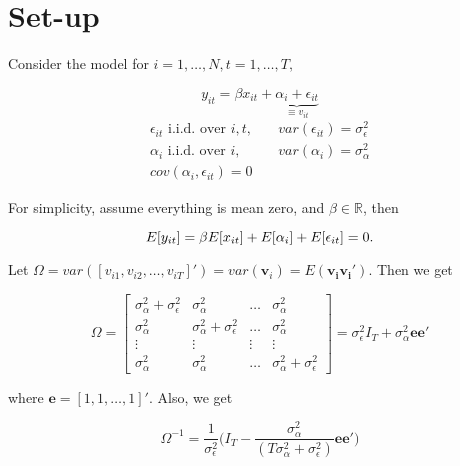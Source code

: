 \documentclass[11pt]{article}
\begin{document}



\doublespacing


\section*{Set-up}

Consider the model for $i=1, \ldots, N, t=1, \ldots, T,$

\[
y_{it} = \beta x_{it} + \underbrace{\alpha_i + \epsilon_{it}}_{\equiv v_{it}}
\]
\begin{align*}
\epsilon_{it}\,\, \text{i.i.d. over $i, t$}, \quad & var(\epsilon_{it})=\sigma_\epsilon^2\\
\alpha_i \,\, \text{i.i.d. over $i$},\quad & var(\alpha_i) = \sigma_\alpha^2 \\
cov(\alpha_i, \epsilon_{it}) = 0 
\end{align*}

For simplicity, assume everything is mean zero, and $\beta \in \mathbb{R}$, then

\[
E[y_{it}]=\beta E[x_{it}] + E[\alpha_i] + E[\epsilon_{it}] = 0.\\
\]

Let $\Omega =var([v_{i1}, v_{i2}, \ldots, v_{iT}]') = var(\mathbf{v}_i) = E(\mathbf{v_i}\mathbf{v_i}')$. Then we get 

\[
\Omega = \begin{bmatrix}
\sigma_\alpha^2 + \sigma_\epsilon^2  & \sigma_\alpha^2 & \ldots & \sigma_\alpha^2\\ 
\sigma_\alpha^2 & \sigma_\alpha^2 + \sigma_\epsilon^2 & \ldots & \sigma_\alpha^2\\ 
\vdots & \vdots & \vdots& \vdots\\ 
\sigma_\alpha^2 & \sigma_\alpha^2 & \ldots & \sigma_\alpha^2 + \sigma_\epsilon^2
\end{bmatrix}
= \sigma_\epsilon^2 I_T + \sigma_\alpha^2 \mathbf{ee'}
\]

where $\mathbf{e}= [1, 1, \ldots, 1]'$. Also, we get

\[
\Omega^{-1} = \frac{1}{\sigma_\epsilon^2} \bigg( I_T - \frac{\sigma_\alpha^2}{(T\sigma_\alpha^2 + \sigma_\epsilon^2)} \mathbf{ee'}   \bigg)
\]
\end{document}
